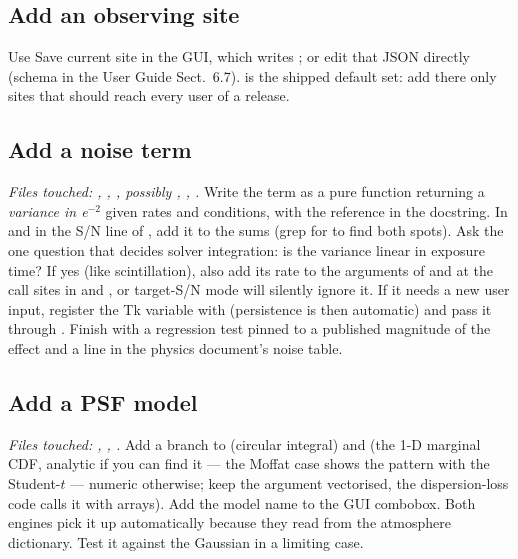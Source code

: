 \subsection{Add an observing site}

Use \textsf{Save current site} in the GUI, which writes
; or edit that JSON directly (schema in the User
Guide Sect.~6.7).  is the shipped default set:
add there only sites that should reach every user of a release.

\subsection{Add a noise term}

\emph{Files touched: ,
, , possibly
, , .} Write the term as
a pure function returning a \emph{variance in e$^{-2}$} given rates and
conditions, with the reference in the docstring. In
 and in the S/N line of
, add it to the
 sums (grep for  to find
both spots). Ask the one question that decides solver integration: is
the variance linear in exposure time? If yes (like scintillation), also
add its rate to the  arguments of
 and  at the call sites
in  and , or target-S/N mode
will silently ignore it. If it needs a new user input, register the Tk
variable with  (persistence is then
automatic) and pass it through . Finish with a
regression test pinned to a published magnitude of the effect and a line
in the physics document's noise table.

\subsection{Add a PSF model}

\emph{Files touched: , ,
.} Add a branch to  (circular
integral) and  (the 1-D marginal CDF,
analytic if you can find it --- the Moffat case shows the pattern with
the Student-$t$ --- numeric otherwise; keep the 
argument vectorised, the dispersion-loss code calls it with arrays).
Add the model name to the GUI combobox. Both engines pick it up
automatically because they read  from the atmosphere
dictionary. Test it against the Gaussian in a limiting case.

